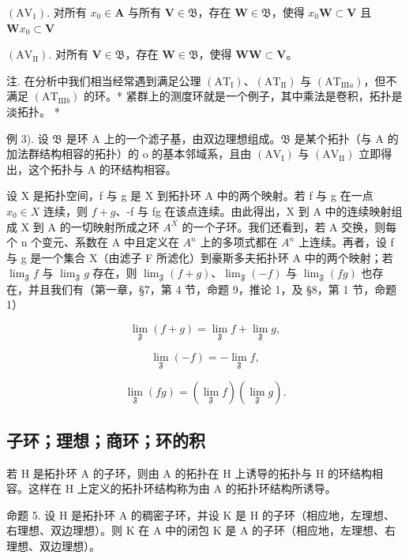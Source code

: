 \((\mathrm{AV}_{1})\). 对所有 \(x_0\in \mathbf{A}\) 与所有 \(\mathbf{V}\in \mathfrak{B}\)，存在 \(\mathbf{W}\in \mathfrak{B}\)，使得 \(x_0\mathbf{W}\subset \mathbf{V}\) 且 \(\mathbf{W}x_0\subset \mathbf{V}\)

\((\mathrm{AV}_{\mathrm{II}})\). 对所有 \(\mathbf{V} \in \mathfrak{B}\)，存在 \(\mathbf{W} \in \mathfrak{B}\)，使得 \(\mathbf{WW} \subset \mathbf{V}\)。

注. 在分析中我们相当经常遇到满足公理 \((\mathrm{AT}_{\mathrm{I}})\)、\((\mathrm{AT}_{\mathrm{II}})\) 与 \((\mathrm{AT}_{\mathrm{III}a})\)，但不满足 \((\mathrm{AT}_{\mathrm{III}b})\) 的环。* 紧群上的测度环就是一个例子，其中乘法是卷积，拓扑是淡拓扑。 *

例 3). 设 \(\mathfrak{B}\) 是环 A 上的一个滤子基，由双边理想组成。\(\mathfrak{B}\) 是某个拓扑（与 A 的加法群结构相容的拓扑）的 o 的基本邻域系，且由 \((\mathrm{AV}_{\mathrm{I}})\) 与 \((\mathrm{AV}_{\mathrm{II}})\) 立即得出，这个拓扑与 A 的环结构相容。

设 X 是拓扑空间，f 与 g 是 X 到拓扑环 A 中的两个映射。若 f 与 g 在一点 \(x_{0} \in X\) 连续，则 \(f + g\)、-f 与 fg 在该点连续。由此得出，X 到 A 中的连续映射组成 X 到 A 的一切映射所成之环 \(A^{X}\) 的一个子环。我们还看到，若 A 交换，则每个 n 个变元、系数在 A 中且定义在 \(A^{n}\) 上的多项式都在 \(A^{n}\) 上连续。再者，设 f 与 g 是一个集合 X（由滤子 F 所滤化）到豪斯多夫拓扑环 A 中的两个映射；若 \(\lim_{\mathfrak{F}} f\) 与 \(\lim_{\mathfrak{F}} g\) 存在，则 \(\lim_{\mathfrak{F}} (f + g)\)、\(\lim_{\mathfrak{F}} (-f)\) 与 \(\lim_{\mathfrak{F}} (fg)\) 也存在，并且我们有（第一章，§7，第 4 节，命题 9，推论 1，及 §8，第 1 节，命题 1）

\[
\lim _ {\mathfrak {F}} (f + g) = \lim _ {\mathfrak {F}} f + \lim _ {\mathfrak {F}} g,\tag{1}
\]

\[
\lim _ {\mathfrak {F}} (- f) = - \lim _ {\mathfrak {F}} f,\tag{2}
\]

\[
\lim _ {\mathfrak {F}} (f g) = (\lim _ {\mathfrak {F}} f) (\lim _ {\mathfrak {F}} g).\tag{3}
\]

\subsection{子环；理想；商环；环的积}

若 H 是拓扑环 A 的子环，则由 A 的拓扑在 H 上诱导的拓扑与 H 的环结构相容。这样在 H 上定义的拓扑环结构称为由 A 的拓扑环结构所诱导。

命题 5. 设 H 是拓扑环 A 的稠密子环，并设 K 是 H 的子环（相应地，左理想、右理想、双边理想）。则 K 在 A 中的闭包 K 是 A 的子环（相应地，左理想、右理想、双边理想）。

